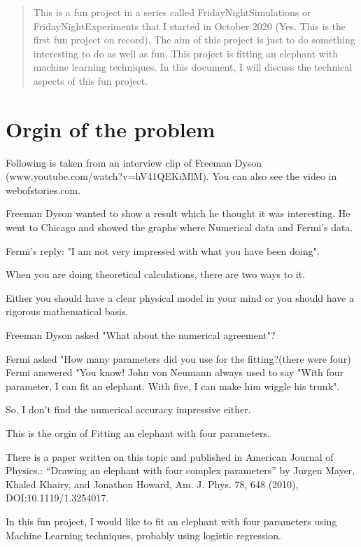 \documentclass[]{article}
\begin{document}
\begin{abstract}
This is a fun project in a series called FridayNightSimulations or FridayNightExperiments that I started in October 2020 (Yes. This is the first fun project on record). The aim of this project is just to do something interesting to do as well as fun. This project is fitting an elephant with machine learning techniques. In this document, I will discuss the technical aspects of this fun project.

\end{abstract}


\section{Orgin of the problem}

Following is taken from an interview clip of Freeman Dyson (www.youtube.com/watch?v=hV41QEKiMlM). 
You can also see the video in webofstories.com.

Freeman Dyson wanted to show a result which he thought it was interesting. He went to Chicago and showed the graphs where Numerical data and Fermi's data. 

Fermi's reply: "I am not very impressed with what you have been doing".

When you are doing theoretical calculations, there are two ways to it. 

Either you should have a clear physical model in your mind or you should have a rigorous mathematical basis. 

Freeman Dyson asked "What about the numerical agreement"?

Fermi asked "How many parameters did you use for the fitting?(there were four)
Fermi answered "You know! John von Neumann always used to say "With four parameter, I can fit an elephant. With five, I can make him wiggle his trunk". 

So, I don't find the numerical accuracy impressive either.

This is the orgin of Fitting an elephant with four parameters.

There is a paper written on this topic and published in American Journal of Physics.: “Drawing an elephant with four complex parameters” by Jurgen Mayer, Khaled Khairy, and Jonathon Howard,  Am. J. Phys. 78, 648 (2010), DOI:10.1119/1.3254017.

In this fun project, I would like to fit an elephant with four parameters using Machine Learning techniques, probably using logistic regression.
\end{document}
